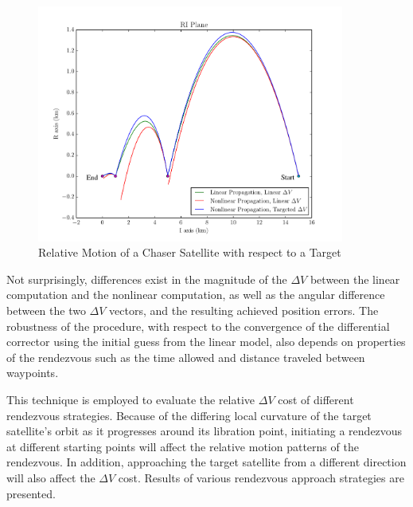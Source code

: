 \documentclass[a4paper]{article}
\begin{document}
\begin{figure}[h] 
	\begin{center}
		\includegraphics[width=0.9\textwidth]{RIC_1}
		\caption{Relative Motion of a Chaser Satellite with respect to a Target}
		\label{fig:RIC_1}
	\end{center}
\end{figure}

Not surprisingly, differences exist in the magnitude of the \(\Delta V\) between the linear computation and the nonlinear computation, as well as the angular difference between the two \(\Delta V\) vectors, and the resulting achieved position errors.  The robustness of the procedure, with respect to the convergence of the differential corrector using the initial guess from the linear model, also depends on properties of the rendezvous such as the time allowed and distance traveled between waypoints.

This technique is employed to evaluate the relative \(\Delta V\) cost of different rendezvous strategies.  Because of the differing local curvature of the target satellite's orbit as it progresses around its libration point, initiating a rendezvous at different starting points will affect the relative motion patterns of the rendezvous. In addition, approaching the target satellite from a different direction will also affect the \(\Delta V\) cost.  Results of various rendezvous approach strategies are presented.

\clearpage



\end{document}
